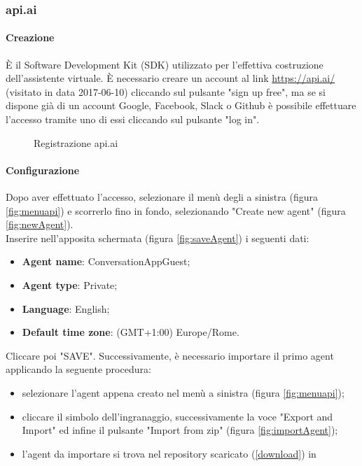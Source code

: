 \subsubsection{api.ai}\label{api}
\paragraph{Creazione}
È il Software Development Kit (SDK) utilizzato per l'effettiva costruzione dell'assistente virtuale.
È necessario creare un account al link \url{https://api.ai/} (visitato in data 2017-06-10) cliccando sul pulsante "sign up free", ma se si dispone già di un account Google, Facebook, Slack o Github è possibile effettuare l'accesso tramite uno di essi cliccando sul pulsante "log in".
\begin{figure}[H]
	\caption{Registrazione api.ai}
\end{figure}
\newpage
\paragraph{Configurazione}
Dopo aver effettuato l'accesso, selezionare il menù degli  a sinistra (figura \ref{fig:menuapi}) e scorrerlo fino in fondo, selezionando "Create new agent" (figura \ref{fig:newAgent}). \\

Inserire nell'apposita schermata (figura \ref{fig:saveAgent}) i seguenti dati:
\begin{itemize}
	\item \textbf{Agent name}: ConversationAppGuest;
	\item \textbf{Agent type}: Private;
	\item \textbf{Language}: English;
	\item \textbf{Default time zone}: (GMT+1:00) Europe/Rome.
\end{itemize}
Cliccare poi "SAVE".
Successivamente, è necessario importare il primo agent applicando la seguente procedura:
\begin{itemize}
	\item selezionare l'agent appena creato nel menù a sinistra (figura \ref{fig:menuapi});
	\item cliccare il simbolo dell'ingranaggio, successivamente la voce "Export and Import" ed infine il pulsante "Import from zip" (figura \ref{fig:importAgent});
	\item l'agent da importare si trova nel repository scaricato (\ref{download}) in\\ 
\end{itemize}


